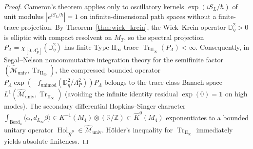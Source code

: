 \documentclass[11pt,a4paper]{article}
\theoremstyle{plain}
\theoremstyle{definition}
\theoremstyle{remark}
\newcommand{\TrII}{\operatorname{Tr}_{\mathrm{II}_\infty}}
\newcommand{\Hol}{\operatorname{Hol}}
\newcommand{\Bord}{\operatorname{Bord}}
\newcommand{\M}{\mathcal{M}}
\newcommand{\R}{\mathbb{R}}
\newcommand{\Z}{\mathbb{Z}}
\newcommand{\Dbb}{\mathbb{D}}
\begin{document}
\begin{proof}
Cameron's theorem \cite{Cameron1960} applies only to oscillatory kernels $\exp(i S_L/\hbar)$ of unit modulus $|e^{iS_L/\hbar}| = 1$ on infinite-dimensional path spaces without a finite-trace projection. By Theorem~\ref{thm:wick_krein}, the Wick--Krein operator $\Dbb_\eta^2 > 0$ is elliptic with compact resolvent on $M_T$, so the spectral projection $P_\Lambda = \chi_{[0,\Lambda_P^2]}(\Dbb_\eta^2)$ has finite Type $\mathrm{II}_\infty$ trace $\TrII(P_\Lambda) < \infty$. Consequently, in Segal--Nelson noncommutative integration theory \cite{Nelson1974} for the semifinite factor $(\widehat{\M}_{\mathrm{univ}}, \TrII)$, the compressed bounded operator $P_\Lambda \exp(-f_{\mathrm{unimod}}(\Dbb_\eta^2/\Lambda_P^2)) P_\Lambda$ belongs to the trace-class Banach space $L^1(\widehat{\M}_{\mathrm{univ}}, \TrII)$ (avoiding the infinite identity residual $\exp(0) = \mathbf{1}$ on high modes). The secondary differential Hopkins--Singer character $\int_{\Bord_4}\langle\alpha, d_{L_\infty}\beta\rangle \in K^{-1}(M_4)\otimes(\R/\Z) \subset \widehat{K}^0(M_4)$ \cite{HopkinsSinger2005} exponentiates to a bounded unitary operator $\Hol_{\widehat{K}^0} \in \widehat{\M}_{\mathrm{univ}}$. H\"older's inequality for $\TrII$ immediately yields absolute finiteness.
\end{proof}
\end{document}
